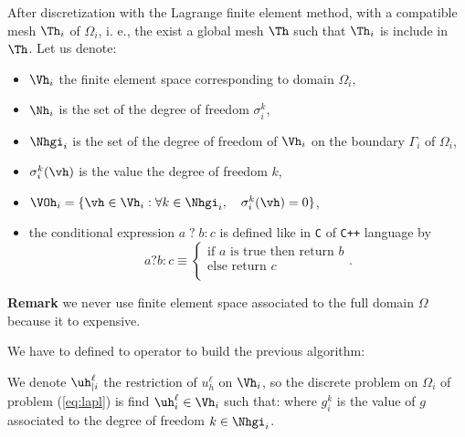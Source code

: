 \documentclass[a4paper,twoside,12pt]{book}
\begin{document}
After discretization with the Lagrange finite element method, with a compatible mesh $\Th_i$ of $\Omega_i$,
i. e., the exist a global mesh $\Th$ such that  $\Th_i$ is include in $\Th$. 
Let us denote:
\begin{itemize}
\item $\Vh_i$ the finite element space corresponding to domain $\Omega_i$, 
\item  $\Nh_i$ is the set of the   degree of freedom $\sigma_i^k $,
\item  $\Nhgi_{i}$ is the set of 
the   degree of freedom of $\Vh_i$ on the boundary $\Gamma_i$ of $\Omega_i$, 
\item  $\sigma_i^k(\vh)$  is the value  the degree of freedom $k$,
\item $\VOh_i=  \{ \vh \in \Vh_i :\forall  k \in  \Nhgi_{i}, \quad \sigma_i^k(\vh)=0 \}$,
\item the conditional expression $ a\;?\;b:c $ is defined like in \texttt{C} of \texttt{C++} language by 
$$  a?b: c \equiv
\left\{
\begin{array}{l}
\mbox{if  $a$ is true  then return $b$}\\
\mbox{else return $c$}  \\
\end{array}
\right..
$$

\end{itemize}
 
 
\medskip 


{\bf Remark} we never use finite element space associated to the full domain $\Omega$ because it to expensive.

\medskip 



We have to defined to operator to build the  previous algorithm:

We denote $\uh^{\ell}_{|i}$  the restriction of $ u_h^\ell$ on $\Vh_i$, so  the discrete problem on $\Omega_i$ 
of problem (\ref{eq:lapl}) is find $\uh^{\ell}_{i}\in \Vh_i$ such that:
where $g_i^k$ is the value of $g$ associated to the degree of freedom $k\in \Nhgi_{i} $.
\end{document}
